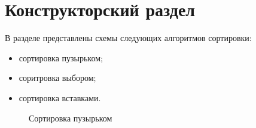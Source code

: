 \chapter{Конструкторский раздел}
В разделе представлены схемы следующих алгоритмов сортировки:
\begin{itemize}
	\item сортировка пузырьком;
	\item соритровка выбором;
	\item сортировка вставками.
\end{itemize}

\begin{figure}
	\caption{Сортировка пузырьком}
\end{figure}